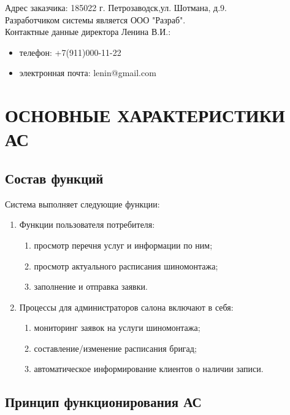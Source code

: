\documentclass[russian, utf8, 12pt,pointsubsection,floatsubsection]{eskdtext}
\begin{document}
Адрес заказчика: 185022 г. Петрозаводск,ул. Шотмана, д.9.\\

Разработчиком системы является ООО "Разраб".\\

Контактные данные директора Ленина В.И.: 
\begin{itemize}
    \item телефон: +7(911)000-11-22
    \item электронная почта: lenin@gmail.com
\end{itemize}


\section{ОСНОВНЫЕ ХАРАКТЕРИСТИКИ АС}
\subsection{Состав функций}
Система выполняет следующие функции:
\begin{enumerate}
    \item Функции пользователя потребителя:
    \begin{enumerate}
        \item просмотр перечня услуг и информации по ним;
        \item просмотр актуального расписания шиномонтажа;
        \item заполнение и отправка заявки.
    \end{enumerate}
    \item Процессы для администраторов салона включают в себя:
    \begin{enumerate}
        \item мониторинг заявок на услуги шиномонтажа;
        \item составление/изменение расписания бригад;
        \item автоматическое информирование клиентов о наличии записи.
    \end{enumerate}
\end{enumerate}

\subsection{Принцип функционирования АС}
\end{document}
